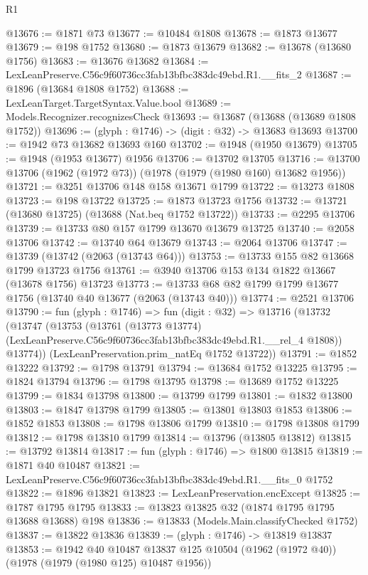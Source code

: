 \begin{lexlean}{R1}
\begin{coremodule}
@13676 := @1871 @73
@13677 := @10484 @1808
@13678 := @1873 @13677
@13679 := @198 @1752
@13680 := @1873 @13679
@13682 := @13678 (@13680 @1756)
@13683 := @13676 @13682
@13684 := LexLeanPreserve.C56c9f60736cc3fab13bfbc383dc49ebd.R1.__fits_2
@13687 := @1896 (@13684 @1808 @1752)
@13688 := LexLeanTarget.TargetSyntax.Value.bool
@13689 := Models.Recognizer.recognizesCheck
@13693 := @13687 (@13688 (@13689 @1808 @1752))
@13696 := (glyph : @1746) -> (digit : @32) -> @13683 @13693
@13700 := @1942 @73 @13682 @13693 @160
@13702 := @1948 (@1950 @13679)
@13705 := @1948 (@1953 @13677) @1956
@13706 := @13702 @13705
@13716 := @13700 @13706 (@1962 (@1972 @73)) (@1978 (@1979 (@1980 @160) @13682 @1956))
@13721 := @3251 @13706 @148 @158 @13671 @1799
@13722 := @13273 @1808
@13723 := @198 @13722
@13725 := @1873 @13723 @1756
@13732 := @13721 (@13680 @13725) (@13688 (Nat.beq @1752 @13722))
@13733 := @2295 @13706
@13739 := @13733 @80 @157 @1799 @13670 @13679 @13725
@13740 := @2058 @13706
@13742 := @13740 @64 @13679
@13743 := @2064 @13706
@13747 := @13739 (@13742 (@2063 (@13743 @64)))
@13753 := @13733 @155 @82 @13668 @1799 @13723 @1756
@13761 := @3940 @13706 @153 @134 @1822 @13667 (@13678 @1756) @13723
@13773 := @13733 @68 @82 @1799 @1799 @13677 @1756 (@13740 @40 @13677 (@2063 (@13743 @40)))
@13774 := @2521 @13706
@13790 := fun (glyph : @1746) =>
  fun (digit : @32) =>
  @13716
    (@13732
      (@13747
        (@13753
          (@13761
            (@13773 @13774)
            (LexLeanPreserve.C56c9f60736cc3fab13bfbc383dc49ebd.R1.__rel_4 @1808))
          @13774))
      (LexLeanPreservation.prim_natEq @1752 @13722))
@13791 := @1852 @13222
@13792 := @1798 @13791
@13794 := @13684 @1752 @13225
@13795 := @1824 @13794
@13796 := @1798 @13795
@13798 := @13689 @1752 @13225
@13799 := @1834 @13798
@13800 := @13799 @1799
@13801 := @1832 @13800
@13803 := @1847 @13798 @1799
@13805 := @13801 @13803 @1853
@13806 := @1852 @1853
@13808 := @1798 @13806 @1799
@13810 := @1798 @13808 @1799
@13812 := @1798 @13810 @1799
@13814 := @13796 (@13805 @13812)
@13815 := @13792 @13814
@13817 := fun (glyph : @1746) => @1800 @13815
@13819 := @1871 @40 @10487
@13821 := LexLeanPreserve.C56c9f60736cc3fab13bfbc383dc49ebd.R1.__fits_0 @1752
@13822 := @1896 @13821
@13823 := LexLeanPreservation.encExcept
@13825 := @1787 @1795 @1795
@13833 := @13823 @13825 @32 (@1874 @1795 @1795 @13688 @13688) @198
@13836 := @13833 (Models.Main.classifyChecked @1752)
@13837 := @13822 @13836
@13839 := (glyph : @1746) -> @13819 @13837
@13853 := @1942
    @40
    @10487
    @13837
    @125
    @10504
    (@1962 (@1972 @40))
    (@1978 (@1979 (@1980 @125) @10487 @1956))

\end{coremodule}
\end{lexlean}
